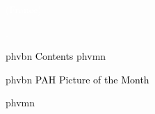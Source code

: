 \begin{multicols}{2}
\begin{shaded}
\textcolor{white}{(France)}

\vspace{0.1cm}

\end{shaded}


\columnbreak
\textcolor{white}{.}

\fontsize{21}{9}  {phv}{b}{n} \selectfont \noindent \textcolor{black}{Contents}
 {phv}{m}{n} 
\fontsize{14}{9}
\selectfont
\sffamily \tableofcontents

\vspace{1.0cm}



\fontsize{19}{10}  {phv}{b}{n} \selectfont \noindent \textcolor{black}{PAH Picture of the Month}


\vspace{0.2cm}

 {phv}{m}{n} 
\fontsize{12}{14}
\selectfont

\noindent{\potmcaption}

\vspace{0.3cm}


\vspace{0.5cm}

       \ourface

\vspace{0.1cm}

\begin{shaded}




\end{shaded}
\end{multicols}
